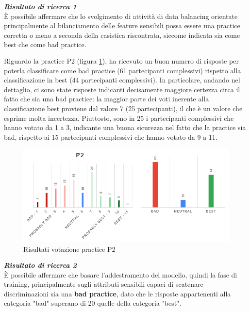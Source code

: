 \begin{center}
    \begin{tcolorbox}[width=400pt, colframe=black, colback=Gray!30]
		\begin{minipage}{\textwidth}
			\textit{\faKey \textbf{ Risultato di ricerca 1}}\\
			È possibile affermare che lo svolgimento di attività di data balancing orientate principalmente al bilanciamento delle feature sensibili possa essere una practice corretta o meno a seconda della casistica riscontrata, siccome indicata sia come best che come bad practice.
		\end{minipage}
	\end{tcolorbox}
\end{center}

Riguardo la practice P2 (figura \ref{im-a-prac-3}), ha ricevuto un buon numero di risposte per poterla classificare come bad practice (61 partecipanti complessivi) rispetto alla classificazione in best (44 partecipanti complessivi). In particolare, andando nel dettaglio, ci sono state risposte indicanti decisamente maggiore certezza circa il fatto che sia una bad practice: la maggior parte dei voti inerente alla classificazione best proviene dal valore 7 (25 partecipanti), il che è un valore che esprime molta incertezza. Piuttosto, sono in 25 i partecipanti complessivi che hanno votato da 1 a 3, indicante una buona sicurezza nel fatto che la practice sia bad, rispetto ai 15 partecipanti complessivi che hanno votato da 9 a 11.

\begin{figure}[h!]
    \centering
    \includegraphics[width=1\textwidth]{figure/data-analysis3/P2.png}
    \caption{Risultati votazione practice P2}
    \label{im-a-prac-3}
\end{figure}

\begin{center}
    \begin{tcolorbox}[width=400pt, colframe=black, colback=Gray!30]
		\begin{minipage}{\textwidth}
			\textit{\faKey \textbf{ Risultato di ricerca 2}}\\
			È possibile affermare che basare l'addestramento del modello, quindi la fase di training, principalmente sugli attributi sensibili capaci di scatenare discriminazioni sia una \textbf{bad practice}, dato che le risposte appartenenti alla categoria "bad" superano di 20 quelle della categoria "best".
		\end{minipage}
	\end{tcolorbox}
\end{center}

